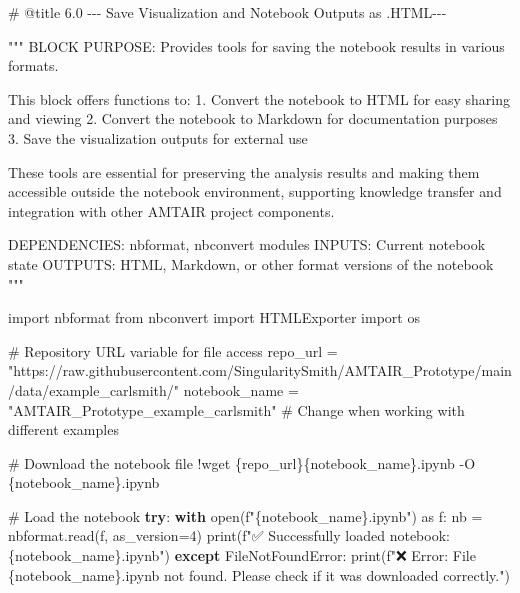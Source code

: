 \documentclass[
  11pt,
  letterpaper,
]{book}
\newenvironment{Shaded}{\begin{snugshade}}{\end{snugshade}}
\newcommand{\BuiltInTok}[1]{\textcolor[rgb]{0.00,0.23,0.31}{#1}}
\newcommand{\CommentTok}[1]{\textcolor[rgb]{0.37,0.37,0.37}{#1}}
\newcommand{\ControlFlowTok}[1]{\textcolor[rgb]{0.00,0.23,0.31}{\textbf{#1}}}
\newcommand{\DecValTok}[1]{\textcolor[rgb]{0.68,0.00,0.00}{#1}}
\newcommand{\ImportTok}[1]{\textcolor[rgb]{0.00,0.46,0.62}{#1}}
\newcommand{\NormalTok}[1]{\textcolor[rgb]{0.00,0.23,0.31}{#1}}
\newcommand{\OperatorTok}[1]{\textcolor[rgb]{0.37,0.37,0.37}{#1}}
\newcommand{\PreprocessorTok}[1]{\textcolor[rgb]{0.68,0.00,0.00}{#1}}
\newcommand{\SpecialCharTok}[1]{\textcolor[rgb]{0.37,0.37,0.37}{#1}}
\newcommand{\SpecialStringTok}[1]{\textcolor[rgb]{0.13,0.47,0.30}{#1}}
\newcommand{\StringTok}[1]{\textcolor[rgb]{0.13,0.47,0.30}{#1}}
\begin{document}
\begin{Shaded}
\begin{Highlighting}[]
\CommentTok{\# @title 6.0 {-}{-}{-} Save Visualization and Notebook Outputs as .HTML{-}{-}{-}}

\CommentTok{"""}
\CommentTok{BLOCK PURPOSE: Provides tools for saving the notebook results in various formats.}

\CommentTok{This block offers functions to:}
\CommentTok{1. Convert the notebook to HTML for easy sharing and viewing}
\CommentTok{2. Convert the notebook to Markdown for documentation purposes}
\CommentTok{3. Save the visualization outputs for external use}

\CommentTok{These tools are essential for preserving the analysis results and making them}
\CommentTok{accessible outside the notebook environment, supporting knowledge transfer}
\CommentTok{and integration with other AMTAIR project components.}

\CommentTok{DEPENDENCIES: nbformat, nbconvert modules}
\CommentTok{INPUTS: Current notebook state}
\CommentTok{OUTPUTS: HTML, Markdown, or other format versions of the notebook}
\CommentTok{"""}

\ImportTok{import}\NormalTok{ nbformat}
\ImportTok{from}\NormalTok{ nbconvert }\ImportTok{import}\NormalTok{ HTMLExporter}
\ImportTok{import}\NormalTok{ os}

\CommentTok{\# Repository URL variable for file access}
\NormalTok{repo\_url }\OperatorTok{=} \StringTok{"https://raw.githubusercontent.com/SingularitySmith/AMTAIR\_Prototype/main/data/example\_carlsmith/"}
\NormalTok{notebook\_name }\OperatorTok{=} \StringTok{"AMTAIR\_Prototype\_example\_carlsmith"}  \CommentTok{\# Change when working with different examples}

\CommentTok{\# Download the notebook file}
\OperatorTok{!}\NormalTok{wget \{repo\_url\}\{notebook\_name\}.ipynb }\OperatorTok{{-}}\NormalTok{O \{notebook\_name\}.ipynb}

\CommentTok{\# Load the notebook}
\ControlFlowTok{try}\NormalTok{:}
  \ControlFlowTok{with} \BuiltInTok{open}\NormalTok{(}\SpecialStringTok{f"}\SpecialCharTok{\{}\NormalTok{notebook\_name}\SpecialCharTok{\}}\SpecialStringTok{.ipynb"}\NormalTok{) }\ImportTok{as}\NormalTok{ f:}
\NormalTok{    nb }\OperatorTok{=}\NormalTok{ nbformat.read(f, as\_version}\OperatorTok{=}\DecValTok{4}\NormalTok{)}
  \BuiltInTok{print}\NormalTok{(}\SpecialStringTok{f"✅ Successfully loaded notebook: }\SpecialCharTok{\{}\NormalTok{notebook\_name}\SpecialCharTok{\}}\SpecialStringTok{.ipynb"}\NormalTok{)}
\ControlFlowTok{except} \PreprocessorTok{FileNotFoundError}\NormalTok{:}
  \BuiltInTok{print}\NormalTok{(}\SpecialStringTok{f"❌ Error: File \textquotesingle{}}\SpecialCharTok{\{}\NormalTok{notebook\_name}\SpecialCharTok{\}}\SpecialStringTok{.ipynb\textquotesingle{} not found. Please check if it was downloaded correctly."}\NormalTok{)}


\end{Highlighting}
\end{Shaded}
\end{document}
